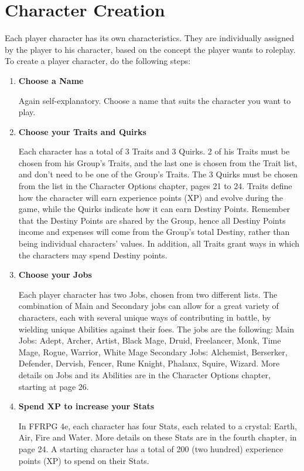 \section{Character Creation}
Each player character has its own
characteristics. They are individually assigned by
the player to his character, based on the concept
the player wants to roleplay. To create a player
character, do the following steps:
\begin{enumerate}
\item \textbf{Choose a Name}

Again self-explanatory. Choose a name that
suits the character you want to play.

\item \textbf{Choose your Traits and Quirks}

Each character has a total of 3 Traits and 3
Quirks. 2 of his Traits must be chosen from his
Group’s Traits, and the last one is chosen from the
Trait list, and don’t need to be one of the Group's
Traits. The 3 Quirks must be chosen from the list
in the Character Options chapter, pages 21 to 24.
Traits define how the character will earn
experience points (XP) and evolve during the game,
while the Quirks indicate how it can earn Destiny
Points. Remember that the Destiny Points are
shared by the Group, hence all Destiny Points
income and expenses will come from the Group's
total Destiny, rather than being individual
characters’ values. In addition, all Traits grant
ways in which the characters may spend Destiny
points.

\item \textbf{Choose your Jobs}

Each player character has two Jobs, chosen
from two different lists. The combination of Main
and Secondary jobs can allow for a great variety of
characters, each with several unique ways of
contributing in battle, by wielding unique Abilities
against their foes. The jobs are the following:
Main Jobs: Adept, Archer, Artist, Black Mage,
Druid, Freelancer, Monk, Time Mage, Rogue,
Warrior, White Mage
Secondary Jobs: Alchemist, Berserker, Defender,
Dervish, Fencer, Rune Knight, Phalanx, Squire,
Wizard.
More details on Jobs and its Abilities are in the
Character Options chapter, starting at page 26.

\item \textbf{Spend XP to increase your Stats}

In FFRPG 4e, each character has four Stats,
each related to a crystal: Earth, Air, Fire and Water.
More details on these Stats are in the fourth
chapter, in page 24. A starting character has a total
of 200 (two hundred) experience points (XP) to
spend on their Stats.


\end{enumerate}
